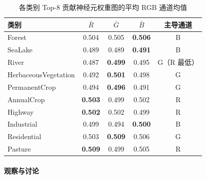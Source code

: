 \documentclass[12pt, a4paper]{article}
\begin{document}
\begin{table}[H]
  \centering
  \caption{各类别 Top-8 贡献神经元权重图的平均 RGB 通道均值}
  \label{tab:rgb}
  \begin{tabular}{lcccc}
    \toprule
    \textbf{类别} & $\bar{R}$ & $\bar{G}$ & $\bar{B}$ & \textbf{主导通道} \\
    \midrule
    Forest               & 0.504 & 0.505 & \textbf{0.506} & B \\
    SeaLake              & 0.489 & 0.489 & \textbf{0.491} & B \\
    River                & 0.487 & \textbf{0.499} & 0.495 & G（R 最低）\\
    HerbaceousVegetation & 0.492 & \textbf{0.501} & 0.498 & G \\
    PermanentCrop        & 0.494 & \textbf{0.496} & 0.491 & G \\
    AnnualCrop           & \textbf{0.503} & 0.499 & 0.502 & R \\
    Highway              & \textbf{0.502} & 0.502 & 0.499 & R \\
    Industrial           & 0.499 & 0.494 & \textbf{0.500} & B \\
    Residential          & 0.503 & \textbf{0.509} & 0.506 & G \\
    Pasture              & \textbf{0.509} & 0.499 & 0.505 & R \\
    \bottomrule
  \end{tabular}
\end{table}

\paragraph{观察与讨论}
\end{document}
